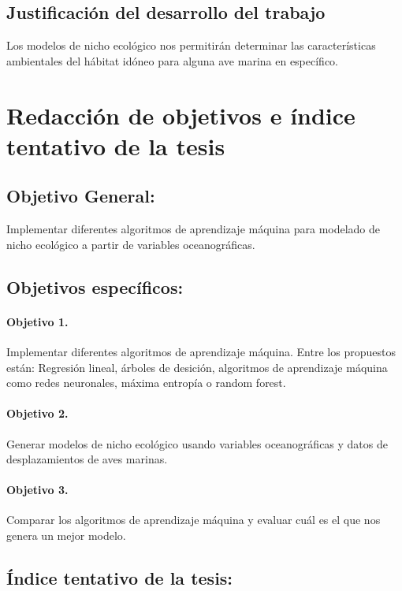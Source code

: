 \documentclass[runningheads,a4paper]{llncs}
\begin{document}
\subsection{Justificación del desarrollo del trabajo}

Los modelos de nicho ecológico nos permitirán determinar las características
ambientales del hábitat idóneo para alguna ave marina en específico.

\section{Redacción de objetivos e índice tentativo de la tesis}
\subsection{Objetivo General:}
Implementar diferentes algoritmos de aprendizaje máquina para modelado de nicho
ecológico a partir de variables oceanográficas.

\subsection{Objetivos específicos:}

\paragraph{Objetivo 1.}

Implementar diferentes algoritmos de aprendizaje máquina. Entre los
propuestos están: Regresión lineal, árboles de desición, algoritmos de
aprendizaje máquina como redes neuronales, máxima entropía o random forest.

\paragraph{Objetivo 2.}

Generar modelos de nicho ecológico usando variables oceanográficas y datos
de desplazamientos de aves marinas.

\paragraph{Objetivo 3.}

Comparar los algoritmos de aprendizaje máquina y evaluar cuál es el que
nos genera un mejor modelo.


\subsection{Índice tentativo de la tesis:}
\end{document}
